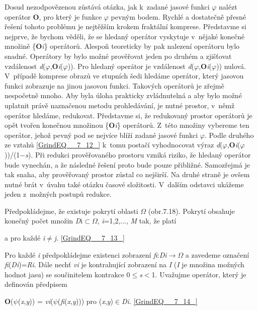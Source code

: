 \noindent Dosud nezodpovězenou zůstává otázka, jak k~zadané jasové funkci $\varphi$ nalézt operátor \textbf{O}, pro který je funkce $\varphi$ pevným bodem. Rychlé a dostatečně přesné řešení tohoto problému je nejtěžším krokem fraktální komprese. Představme si nejprve, že bychom věděli, že se hledaný operátor vyskytuje v~nějaké konečné množině \{\textbf{O}\textit{i}\} operátorů. Alespoň teoreticky by pak nalezení operátoru bylo snadné. Operátory by bylo možné prověřovat jeden po druhém a zjišťovat vzdálenost \textit{d}($\varphi$,\textbf{O}\textit{i}($\varphi$)). Pro hledaný operátor je vzdálenost \textit{d}($\varphi$,\textbf{O}\textit{i}($\varphi$)) nulová. V~případě komprese obrazů ve stupních šedi hledáme operátor, který jasovou funkci zobrazuje na jinou jasovou funkci. Takových operátorů je zřejmě nespočetně mnoho. Aby byla úloha prakticky zvládnutelná a aby bylo možné uplatnit právě naznačenou metodu prohledávání, je nutné prostor, v~němž operátor hledáme, redukovat. Představme si, že redukovaný prostor operátorů je opět tvořen konečnou množinou \{\textbf{O}\textit{i}\} operátorů. Z~této množiny vybereme ten operátor, jehož pevný pod se nejvíce blíží zadané jasové funkci $\varphi$. Podle druhého ze vztahů \eqref{GrindEQ__7_12_} k~tomu postačí vyhodnocovat výraz \textit{d}($\varphi$,\textbf{O}\textit{i}($\varphi$))/(1$-$\textit{s}). Při redukci prověřovaného prostoru vzniká riziko, že hledaný operátor bude vynechán, a že následné řešení proto bude pouze přibližné. Samozřejmá je tak snaha, aby prověřovaný prostor zůstal co nejširší. Na druhé straně je ovšem nutné brát v~úvahu také otázku časové složitosti. V~dalším odstavci ukážeme jeden z~možných postupů redukce.

\noindent 

\noindent Předpokládejme, že existuje pokrytí oblasti $\Omega$ (obr.7.18). Pokrytí obsahuje konečný počet množin \textit{D}i$\subset$$\Omega$, \textit{i}=1,2,..., \textit{M}  tak, že platí

    a     pro každé \textit{i}$\neq$\textit{j}. \eqref{GrindEQ__7_13_}

\noindent Pro každé \textit{i} předpokládejme existenci zobrazení \textit{fi}:\textit{Di}$\rightarrow$$\Omega$ a zavedeme označení \textit{fi}(\textit{Di})=\textit{Ri}. Dále nechť \textit{vi} je kontrahující zobrazení na \textit{I} (\textit{I} je množina možných hodnot jasu) se součinitelem kontrakce 0$\leq$\textit{s}$<$1. Uvažujme operátor, který je definován předpisem

 \textbf{O}($\psi$(\textit{x},\textit{y})) = \textit{vi}($\psi$(\textit{fi}(\textit{x},\textit{y})))   pro (\textit{x},\textit{y})$\in$\textit{Di}. \eqref{GrindEQ__7_14_}

